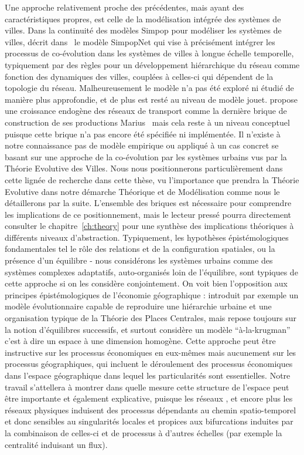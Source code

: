 {Une approche relativement proche des précédentes, mais ayant des caractéristiques propres, est celle de la modélisation intégrée des systèmes de villes. Dans la continuité des modèles Simpop pour modéliser les systèmes de villes,  décrit dans~\cite{schmitt2014modelisation} le modèle SimpopNet qui vise à précisément intégrer les processus de co-évolution dans les systèmes de villes à longue échelle temporelle, typiquement par des règles pour un développement hiérarchique du réseau comme fonction des dynamiques des villes, couplées à celles-ci qui dépendent de la topologie du réseau. Malheureusement le modèle n'a pas été exploré ni étudié de manière plus approfondie, et de plus est resté au niveau de modèle jouet.  propose une croissance endogène des réseaux de transport comme la dernière brique de construction de ses productions Marius~\cite{cottineau2014evolution} mais cela reste à un niveau conceptuel puisque cette brique n'a pas encore été spécifiée ni implémentée. Il n'existe à notre connaissance pas de modèle empirique ou appliqué à un cas concret se basant sur une approche de la co-évolution par les systèmes urbains vus par la Théorie Evolutive des Villes. Nous nous positionnerons particulièrement dans cette lignée de recherche dans cette thèse, vu l'importance que prendra la Théorie Evolutive dans notre démarche Théorique et de Modélisation comme nous le détaillerons par la suite. L'ensemble des briques est nécessaire pour comprendre les implications de ce positionnement, mais le lecteur pressé pourra directement consulter le chapitre~\ref{ch:theory} pour une synthèse des implications théoriques à différents niveaux d'abstraction. Typiquement, les hypothèses épistémologiques fondamentales tel le rôle des relations et de la configuration spatiales, ou la présence d'un équilibre - nous considérons les systèmes urbains comme des systèmes complexes adaptatifs, auto-organisés loin de l'équilibre, sont typiques de cette approche si on les considère conjointement. On voit bien l'opposition aux principes épistémologiques de l'économie géographique : \cite{fujita1999evolution} introduit par exemple un modèle évolutionnaire capable de reproduire une hiérarchie urbaine et une organisation typique de la Théorie des Places Centrales, mais repose toujours sur la notion d'équilibres successifs, et surtout considère un modèle ``à-la-krugman'' c'est à dire un espace à une dimension homogène. Cette approche peut être instructive sur les processus économiques en eux-mêmes mais aucunement sur les processus géographiques, qui incluent le déroulement des processus économiques dans l'espace géographique dans lequel les particularités sont essentielles. Notre travail s'attellera à montrer dans quelle mesure cette structure de l'espace peut être importante et également explicative, puisque les réseaux , et encore plus les réseaux physiques induisent des processus dépendants au chemin spatio-temporel et donc sensibles au singularités locales et propices aux bifurcations induites par la combinaison de celles-ci et de processus à d'autres échelles (par exemple la centralité induisant un flux).
}




